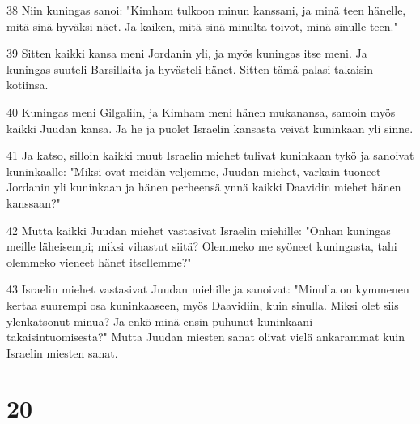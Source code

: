 \par 38 Niin kuningas sanoi: "Kimham tulkoon minun kanssani, ja minä teen hänelle, mitä sinä hyväksi näet. Ja kaiken, mitä sinä minulta toivot, minä sinulle teen."
\par 39 Sitten kaikki kansa meni Jordanin yli, ja myös kuningas itse meni. Ja kuningas suuteli Barsillaita ja hyvästeli hänet. Sitten tämä palasi takaisin kotiinsa.
\par 40 Kuningas meni Gilgaliin, ja Kimham meni hänen mukanansa, samoin myös kaikki Juudan kansa. Ja he ja puolet Israelin kansasta veivät kuninkaan yli sinne.
\par 41 Ja katso, silloin kaikki muut Israelin miehet tulivat kuninkaan tykö ja sanoivat kuninkaalle: "Miksi ovat meidän veljemme, Juudan miehet, varkain tuoneet Jordanin yli kuninkaan ja hänen perheensä ynnä kaikki Daavidin miehet hänen kanssaan?"
\par 42 Mutta kaikki Juudan miehet vastasivat Israelin miehille: "Onhan kuningas meille läheisempi; miksi vihastut siitä? Olemmeko me syöneet kuningasta, tahi olemmeko vieneet hänet itsellemme?"
\par 43 Israelin miehet vastasivat Juudan miehille ja sanoivat: "Minulla on kymmenen kertaa suurempi osa kuninkaaseen, myös Daavidiin, kuin sinulla. Miksi olet siis ylenkatsonut minua? Ja enkö minä ensin puhunut kuninkaani takaisintuomisesta?" Mutta Juudan miesten sanat olivat vielä ankarammat kuin Israelin miesten sanat.

\chapter{20}

